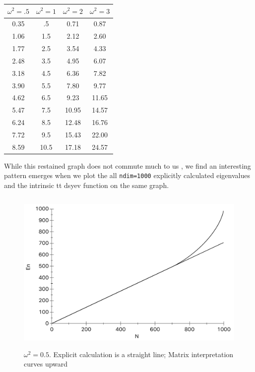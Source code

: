 \documentclass[12pt,letterpaper,notitlepage]{article}
\begin{document}
	\begin{center}
 		\begin{tabular}{||c c c c||} 
 \hline
 		$\omega^2=.5$ & $\omega^2=1$      & $\omega^2=2$       & $\omega^2=3$  	\\ 	[0.5ex] 
 \hline\hline
 		0.35 				& .5 				&0.71 			&0.87 		\\ 
 \hline
 		1.06				& 1.5				&2.12 			&2.60 		\\
 \hline
 		1.77				& 2.5 			&3.54 			&4.33		 \\
 \hline
 		2.48 				& 3.5 			& 4.95 			&6.07 		\\
\hline
 		3.18 				& 4.5				&6.36 			&7.82		 \\  
\hline
 		3.90 				& 5.5				&7.80 			&9.77		 \\  
\hline
 		4.62				& 6.5				&9.23 			&11.65		 \\  
\hline
 		5.47				& 7.5				&10.95 			&14.57		 \\ 
\hline
 		6.24 				& 8.5				&12.48 			&16.76		 \\
\hline
 		7.72 				& 9.5				&15.43 			&22.00		 \\ 
\hline
 		8.59				& 10.5 			&17.18 			&24.57		 \\ 	[1ex] 
 \hline
		\end{tabular}
	\end{center}

	
While this restained graph does not commute much to us , we find an interesting pattern emerges when we plot the all {\tt ndim=1000} explicitly calculated eigenvalues and the intrinsic {tt dsyev} function on the same graph.

	\begin{figure}[H]
		\centering
		\includegraphics[width=13cm, height=8cm, angle=0]{w5.pdf}
			\caption{\label{Fig1} $\omega^2 = 0.5$. Explicit calculation is a straight line; Matrix interpretation curves upward}
	\end{figure}
	
\end{document}

